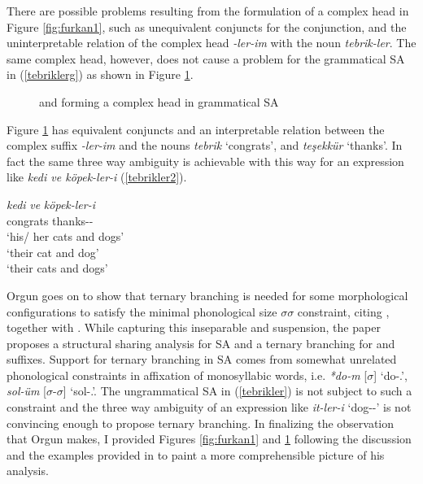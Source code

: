 There are possible problems resulting from the formulation of a complex head in Figure \ref{fig:furkan1}, such as unequivalent conjuncts for the conjunction, and the uninterpretable relation of the complex head \textit{-ler-im} with the noun \textit{tebrik-ler}. The same complex head, however, does not cause a problem for the grammatical SA in (\ref{tebriklerg}) as shown in Figure \ref{fig:furkan2}.

\begin{figure}[hbt!]
    \centering
    \caption{{\Pl} and {\Poss} forming a complex head in grammatical SA}
    \label{fig:furkan2}
\end{figure}

Figure \ref{fig:furkan2} has equivalent conjuncts and an interpretable relation between the complex suffix \textit{-ler-im} and the nouns \textit{tebrik} `congrats', and \textit{teşekkür} `thanks'. In fact the same three way ambiguity is achievable with this way for an expression like \textit{kedi ve köpek-ler-i} (\ref{tebrikler2}).

\begin{exe}
    \ex \label{tebrikler2}
    \gll 
    \textit{kedi} \textit{ve} \textit{köpek-ler-i} \\ congrats {\And} thanks-{\Pl}-{\Poss} \\
    \glt `his/ her cats and dogs' \\ `their cat and dog' \\ `their cats and dogs'
\end{exe}



Orgun goes on to show that ternary branching is needed for some morphological configurations to satisfy the minimal phonological size $\sigma\sigma$ constraint, citing \cite{ito1989notes}, together with \cite{orgun1992turkish}. While capturing this inseparable {\Pl} and {\Poss} suspension, the paper proposes a structural sharing analysis for SA and a ternary branching for {\Pl} and {\Poss} suffixes. Support for ternary branching in SA comes from somewhat unrelated phonological constraints in affixation of monosyllabic words, i.e. \textit{*do-m} [$\sigma$] `do-{\First}{\Sg}.{\Poss}', \textit{sol-üm} [$\sigma$-$\sigma$] `sol-{\First}{\Sg}.{\Poss}'. The ungrammatical SA in (\ref{tebrikler}) is not subject to such a constraint and the three way ambiguity of an expression like \textit{it-ler-i} `dog-{\Pl}-{\Poss}' is not convincing enough to propose ternary branching. In finalizing the observation that Orgun makes, I provided Figures \ref{fig:furkan1} and \ref{fig:furkan2} following the discussion and the examples provided in \cite{orgun1995flat} to paint a more comprehensible picture of his analysis.

